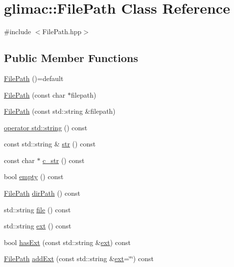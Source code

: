 \hypertarget{classglimac_1_1_file_path}{}\section{glimac\+:\+:File\+Path Class Reference}
\label{classglimac_1_1_file_path}


{\ttfamily \#include $<$File\+Path.\+hpp$>$}

\subsection*{Public Member Functions}
\begin{DoxyCompactItemize}
\item 
\hyperlink{classglimac_1_1_file_path_a1e7e80bf7ccc6b099efd6fa049374150}{File\+Path} ()=default
\item 
\hyperlink{classglimac_1_1_file_path_aa049e2800413955e3e02c8ebae66be9f}{File\+Path} (const char $\ast$filepath)
\item 
\hyperlink{classglimac_1_1_file_path_a7add76a049f3232827af4393c734a3ad}{File\+Path} (const std\+::string \&filepath)
\item 
\hyperlink{classglimac_1_1_file_path_adef5c3ff1a59b5ce13b51d2cc6370fd9}{operator std\+::string} () const
\item 
const std\+::string \& \hyperlink{classglimac_1_1_file_path_a620578376a3387535f94ad16ab4839dd}{str} () const
\item 
const char $\ast$ \hyperlink{classglimac_1_1_file_path_ab2a882fca87897e8eb96ff6fb3b9f3dd}{c\+\_\+str} () const
\item 
bool \hyperlink{classglimac_1_1_file_path_a660dea9e8324aac4962bca25b963ef77}{empty} () const
\item 
\hyperlink{classglimac_1_1_file_path}{File\+Path} \hyperlink{classglimac_1_1_file_path_a75d8d5573b69d79dd745513ddd4b158f}{dir\+Path} () const
\item 
std\+::string \hyperlink{classglimac_1_1_file_path_af62ce630c3e3a5e106556cdf17773f3a}{file} () const
\item 
std\+::string \hyperlink{classglimac_1_1_file_path_ac36e170d0864ed2c5f1296dac2104b15}{ext} () const
\item 
bool \hyperlink{classglimac_1_1_file_path_a2734fcfcdb943df0c3e8b5b0e8285301}{has\+Ext} (const std\+::string \&\hyperlink{classglimac_1_1_file_path_ac36e170d0864ed2c5f1296dac2104b15}{ext}) const
\item 
\hyperlink{classglimac_1_1_file_path}{File\+Path} \hyperlink{classglimac_1_1_file_path_a4167275bb9a0239906a089a0c682ff37}{add\+Ext} (const std\+::string \&\hyperlink{classglimac_1_1_file_path_ac36e170d0864ed2c5f1296dac2104b15}{ext}=\char`\"{}\char`\"{}) const

\end{DoxyCompactItemize}
